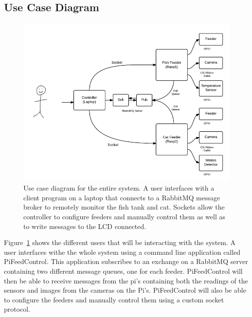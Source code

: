 \subsection{Use Case Diagram}

\begin{figure}[H]
    \centering
    \captionsetup{justification=centering, margin = 0.5cm}
    \includegraphics[scale=0.4]{images/UseCase} 
    \caption{Use case diagram for the entire system. A user interfaces with a
    client program on a laptop that connects to a RabbitMQ message broker to
    remotely monitor the fish tank and cat. Sockets allow the controller to
    configure feeders and manually control them as well as to write messages to
    the LCD connected.}
    \label{fig:UseCase}
\end{figure}

Figure~\ref{fig:UseCase} shows the different users that will be interacting with
the system. A user interfaces withe the whole system using a command line
application called PiFeedControl. This application subscribes to an exchange on
a RabbitMQ server containing two different message queues, one for each feeder.
PiFeedControl will then be able to receive messages from the pi's containing both
the readings of the sensors and images from the cameras on the Pi's. PiFeedControl
will also be able to configure the feeders and manually control them using a
custom socket protocol.

